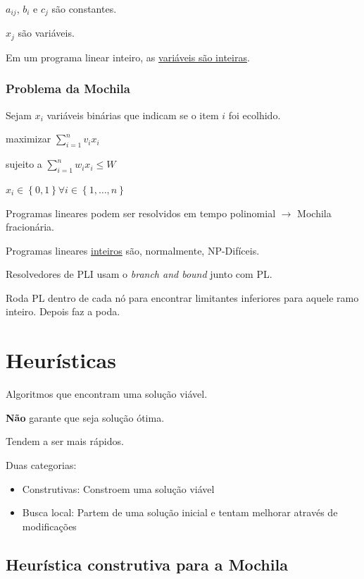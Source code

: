 $a_{ij}$, $b_i$ e $c_j$ são constantes.

$x_j$ são variáveis.

Em um programa linear inteiro, as \underline{variáveis são inteiras}.

\subsubsection{Problema da Mochila}

Sejam $x_i$ variáveis binárias que indicam se o item $i$ foi ecolhido.

\begin{center}
    maximizar $\sum_{i=1}^{n}v_ix_i$

    sujeito a $\sum_{i=1}^{n}w_ix_i \leq W$

    $x_i \in \left\{ 0, 1\right\} \forall i \in \left\{ 1, \dots, n\right\}$
\end{center}

\vspace{\baselineskip}

Programas lineares podem ser resolvidos em tempo polinomial $\to$ Mochila fracionária.

Programas lineares \underline{inteiros} são, normalmente, NP-Difíceis.

Resolvedores de PLI usam o \textit{branch and bound} junto com PL.

Roda PL dentro de cada nó para encontrar limitantes inferiores para aquele ramo inteiro. Depois faz a poda.

\section{Heurísticas}

Algoritmos que encontram uma solução viável.

\textbf{Não} garante que seja solução ótima.

Tendem a ser mais rápidos.

Duas categorias:

\begin{itemize}
    \item Construtivas: Constroem uma solução viável
    \item Busca local: Partem de uma solução inicial e tentam melhorar através de modificações
\end{itemize}

\subsection{Heurística construtiva para a Mochila}

